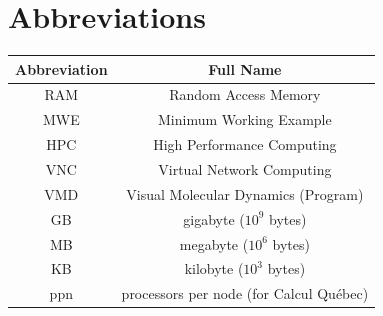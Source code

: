 \documentclass[12pt]{article}
\begin{document}
\section{Abbreviations}
\centering

\begin{tabular}{c|c}
Abbreviation & Full Name \\
\hline
RAM & Random Access Memory \\
MWE & Minimum Working Example \\
HPC & High Performance Computing \\
VNC & Virtual Network Computing \\
VMD & Visual Molecular Dynamics (Program) \\
GB & gigabyte ($10^9$ bytes) \\
MB & megabyte ($10^6$ bytes) \\
KB & kilobyte ($10^3$ bytes) \\
ppn & processors per node (for Calcul Qu\'{e}bec) \\
\end{tabular}
\end{document}
